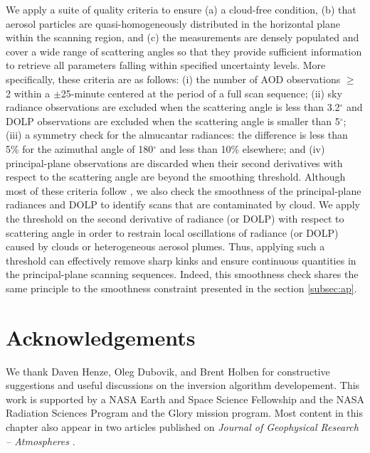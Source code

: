 We apply a suite of quality criteria to ensure (a) a cloud-free condition,
(b) that aerosol particles are quasi-homogeneously distributed in the
horizontal plane within the scanning region, and (c) the measurements
are densely populated and cover a wide range of scattering angles so
that they provide sufficient information to retrieve all parameters
falling within specified uncertainty levels. More specifically, these
criteria are as follows: (i) the number of AOD observations $\geq$ 2 within a 
$\pm$25-minute centered at the period of a full scan sequence; (ii) sky
radiance observations are excluded when the scattering angle is less
than 3.2$^\circ$ and DOLP observations are excluded when the scattering angle
is smaller than 5$^\circ$; (iii) a symmetry check for the almucantar radiances: the
difference is less than 5\% for the azimuthal angle of 180$^\circ$ and less than
10\% elsewhere; and (iv) principal-plane observations are discarded when
their second derivatives with respect to the scattering angle are beyond
the smoothing threshold. Although most of these criteria follow
\citet{Holben06}, we also check the smoothness of the principal-plane
radiances and DOLP to identify scans that are contaminated by cloud. We
apply the threshold on the second derivative of radiance (or DOLP) with
respect to scattering angle in order to restrain local oscillations of
radiance (or DOLP) caused by clouds or heterogeneous aerosol plumes.
Thus, applying such a threshold can effectively remove sharp kinks and
ensure continuous quantities in the principal-plane scanning sequences. 
Indeed, this smoothness check shares the same principle to the smoothness 
constraint presented in the section \ref{subsec:ap}. 

\section{Acknowledgements}

We thank Daven Henze, Oleg Dubovik, and Brent Holben for constructive
suggestions and useful discussions on the inversion algorithm
developement. This work is supported by a NASA Earth and Space Science
Fellowship and the NASA Radiation Sciences Program and the Glory mission
program. Most content in this chapter also appear in two articles
published on \textit{Journal of Geophysical Research – Atmospheres}
\citep{Xu15a, Xu15b}.
